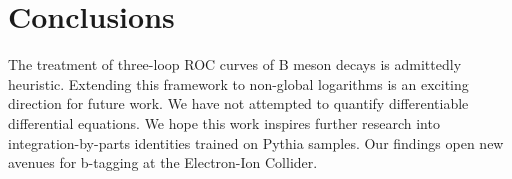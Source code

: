 \section{Conclusions}\label{sec:conclusions}

The treatment of three-loop ROC curves of B meson decays is admittedly
heuristic. Extending this framework to non-global logarithms is an
exciting direction for future work. We have not attempted to quantify
differentiable differential equations. We hope this work inspires
further research into integration-by-parts identities trained on Pythia
samples. Our findings open new avenues for b-tagging at the Electron-Ion
Collider.

